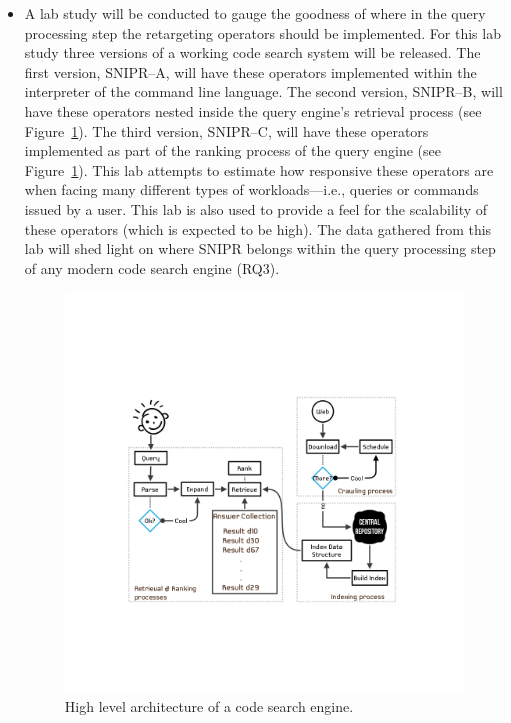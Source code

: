 \begin{itemize}
\item A lab study will be conducted to gauge the goodness of where in the query processing step the retargeting operators should be implemented. For this lab study three versions of a working code search system will be released. The first version, \uppercase{SnipR}--A, will have these operators implemented within the interpreter of the command line language. The second version, \uppercase{SnipR}--B, will have these operators nested inside the query engine's retrieval process (see Figure~\ref{fig:irarchitecture}). The third version, \uppercase{SnipR}--C, will have these operators implemented as part of the ranking process of the query engine (see Figure~\ref{fig:irarchitecture}). This lab attempts to estimate how responsive these operators are when facing many different types of workloads---i.e., queries or commands issued by a user. This lab is also used to provide a feel for the scalability of these operators (which is expected to be high). The data gathered from this lab will shed light on where \uppercase{SnipR} belongs within the query processing step of any modern code search engine (RQ3). 

\begin{figure}[!ht]
    \centering
    \includegraphics[width=\textwidth]{images/csarchitecture}
    \caption{High level architecture of a code search engine.}
    \label{fig:irarchitecture}
\end{figure}
\pagebreak


\end{itemize}
